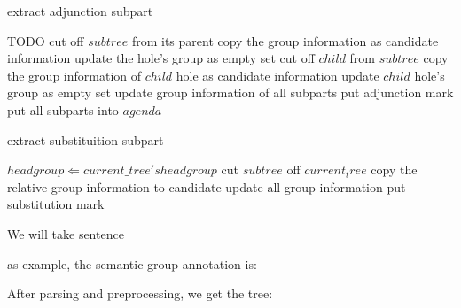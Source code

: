 \documentclass[a4paper]{article}
\begin{document}
\begin{algorithm}
    \caption{extract adjunction subpart}
    \label{alg:extract_adj}
    \begin{algorithmic}[1]
                \STATE TODO
                        \STATE cut off $subtree$ from its parent
                        \STATE copy the group information as candidate information
                        \STATE update the hole's group as empty set
                        \STATE cut off $child$ from $subtree$
                        \STATE copy the group information of $child$ hole as candidate information
                        \STATE update $child$ hole's group as empty set
                        \STATE update group information of all subparts
                        \STATE put adjunction mark
                        \STATE put all subparts into $agenda$
                    \ENDIF
                \ENDIF
            \ENDFOR
        \ENDFOR
    \end{algorithmic}
\end{algorithm}

\begin{algorithm}
    \caption{extract substituition subpart}
    \label{alg:extract_sub}
    \begin{algorithmic}[1]
        \STATE $headgroup \Leftarrow current\_tree's head group$
            \STATE cut $subtree$ off $current_tree$
            \STATE copy the relative group information to candidate
            \STATE update all group information
            \STATE put substitution mark
        \ENDIF
        \ENDFOR
    \end{algorithmic}
\end{algorithm}

We will take sentence


as example, the semantic group annotation is:

After parsing and preprocessing, we get the tree:
\end{document}

